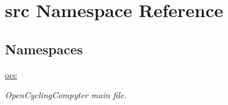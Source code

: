 \hypertarget{namespacesrc}{}\section{src Namespace Reference}
\label{namespacesrc}
\subsection*{Namespaces}
\begin{DoxyCompactItemize}
\item 
 \hyperlink{namespacesrc_1_1occ}{occ}
\begin{DoxyCompactList}\small\item\em Open\+Cycling\+Compyter main file. \end{DoxyCompactList}\end{DoxyCompactItemize}
